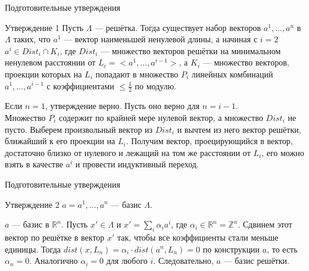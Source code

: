 \documentclass[10pt]{beamer}
\begin{document}
\begin{frame}{Подготовительные утверждения}

\begin{block}{Утверждение 1}
  Пусть $\Lambda$ --- решётка. Тогда существует набор векторов $a^1, \ldots, a^n$ в $\Lambda$ таких, что $a^1$ --- вектор наименьшей ненулевой длины, а начиная с $i=2$ $a^i \in Dist_i \cap K_i$, где $Dist_i$ --- множество векторов решётки на минимальном ненулевом расстоянии от $L_i = <a^1,\ldots,a^{i-1}>$, а $K_i$ --- множество векторов, проекции которых на $L_i$ попадают в множество $P_i$ линейных комбинаций $a^1,\ldots,a^{i-1}$ с коэффициентами $\leq \frac{1}{2}$ по модулю.
\end{block}

Если $n = 1$, утверждение верно. Пусть оно верно для $n = i-1$.\\
Множество $P_i$ содержит по крайней мере нулевой вектор, а множество $Dist_i$ не пусто. Выберем произвольный вектор из $Dist_i$ и вычтем из него вектор решётки, ближайший к его проекции на $L_i$. Получим вектор, проецирующийся в вектор, достаточно близко от нулевого и лежащий на том же расстоянии от $L_i$, его можно взять в качестве $a^i$ и провести индуктивный переход.

\end{frame}

\begin{frame}{Подготовительные утверждения}

\begin{block}{Утверждение 2}
  $a = a^1,\ldots,a^{n}$ ---  базис $\Lambda$.
\end{block}

$a$ --- базис в $\mathbb{R}^n$. Пусть $x' \in \Lambda$ и $x' = \sum_i{\alpha_ia^i}$, где $\alpha_i \in \mathbb{R}^n = \mathbb{Z}^n$. Сдвинем этот вектор по решётке в вектор $x'$ так, чтобы все коэффициенты стали меньше единицы. Тогда $dist(x, L_{n}) = \alpha_i \cdot dist(a^n,L_{n}) = 0$ по конструкции $a$, то есть $\alpha_n=0$. Аналогично $\alpha_i = 0$ для любого $i$. Следовательно, $a$ --- базис решётки.

\end{frame}
\end{document}
